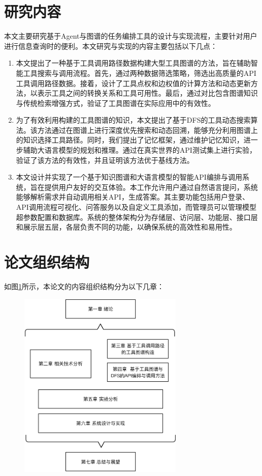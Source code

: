 \section{研究内容}
本文主要研究基于Agent与图谱的任务编排工具的设计与实现流程，主要针对用户进行信息查询时的便利。本文研究与实现的内容主要包括以下几点：

\begin{enumerate}
    \item 本文提出了一种基于工具调用路径数据构建大型工具图谱的方法，旨在辅助智能工具搜索与调用流程。首先，通过两种数据筛选策略，筛选出高质量的API工具调用路径数据。接着，设计了工具点权和边权值的计算方法和动态更新方法，以表示工具之间的转换关系和工具可用性。最后，通过对比包含图谱知识与传统检索增强方式，验证了工具图谱在实际应用中的有效性。
    \item 为了有效利用构建的工具图谱的知识，本文提出了基于DFS的工具动态搜索算法。该方法通过在图谱上进行深度优先搜索和动态回溯，能够充分利用图谱上的知识选择工具路径。同时，我们提出了记忆框架，通过维护记忆知识，进一步辅助大语言模型的规划和推理。通过在真实世界的API测试集上进行实验，验证了该方法的有效性，并且证明该方法优于基线方法。
    \item 本文设计并实现了一个基于知识图谱和大语言模型的智能API编排与调用系统，旨在提供用户友好的交互体验。本工作允许用户通过自然语言提问，系统能够解析需求并自动调用相关API，生成答案。其主要功能包括用户登录、API调用流程可视化、问答服务以及自定义工具添加，而管理员可以管理模型超参数配置和数据库。系统的整体架构分为存储层、访问层、功能层、接口层和展示层五层，各层负责不同的功能，以确保系统的高效性和易用性。
\end{enumerate}

\section{论文组织结构}

如图\ref{fig:ch1-structure}所示，本论文的内容组织结构分为以下几章：

\begin{figure}[!htp]
    \vspace{1em}
    \centering
    \setlength{\abovecaptionskip}{10pt} %
    \includegraphics[height=9cm]{../assets/ch1-论文结构.pdf}
    \label{fig:ch1-structure}
  \end{figure}

